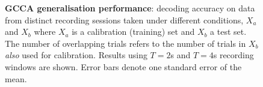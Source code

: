 \begin{figure}[!htb]
\hfill
{}
\caption[GCCA generalisation performance: test decoding accuracy when calibrating and testing on data collected from distinct sessions under different conditions]{\textbf{GCCA generalisation performance}: decoding accuracy on data from distinct recording sessions taken under different conditions, $X_a$ and $X_b$ where $X_a$ is a calibration (training) set and $X_b$ a test set. The number of overlapping trials refers to the number of trials in $X_b$ \textit{also} used for calibration. Results using $T=2$s and $T=4$s recording windows are shown. Error bars denote one standard error of the mean.}
\label{fig:gt-results-gcca}
\end{figure}

